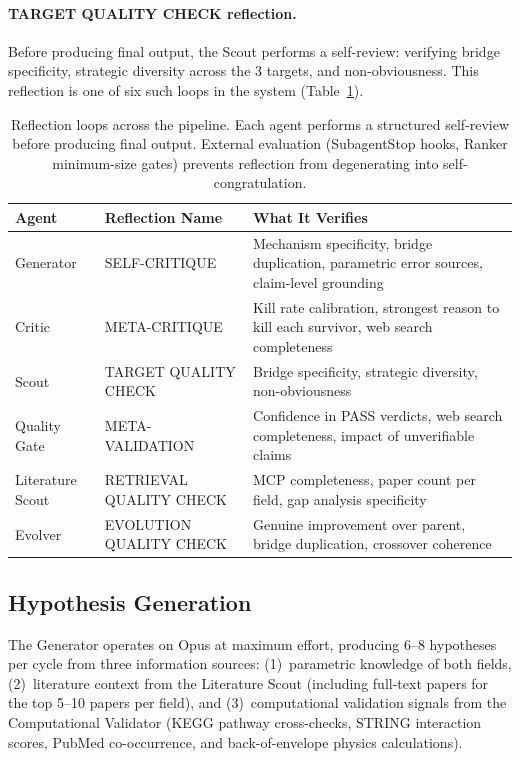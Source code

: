 \paragraph{TARGET QUALITY CHECK reflection.} Before producing final output, the Scout performs a self-review: verifying bridge specificity, strategic diversity across the 3 targets, and non-obviousness. This reflection is one of six such loops in the system (Table~\ref{tab:reflections}).

\begin{table}[t]
\centering
\caption{Reflection loops across the pipeline. Each agent performs a structured self-review before producing final output. External evaluation (SubagentStop hooks, Ranker minimum-size gates) prevents reflection from degenerating into self-congratulation.}
\label{tab:reflections}
\small
\begin{tabular}{@{}llp{6cm}@{}}
\toprule
\textbf{Agent} & \textbf{Reflection Name} & \textbf{What It Verifies} \\
\midrule
Generator & SELF-CRITIQUE & Mechanism specificity, bridge duplication, parametric error sources, claim-level grounding \\
Critic & META-CRITIQUE & Kill rate calibration, strongest reason to kill each survivor, web search completeness \\
Scout & TARGET QUALITY CHECK & Bridge specificity, strategic diversity, non-obviousness \\
Quality Gate & META-VALIDATION & Confidence in PASS verdicts, web search completeness, impact of unverifiable claims \\
Literature Scout & RETRIEVAL QUALITY CHECK & MCP completeness, paper count per field, gap analysis specificity \\
Evolver & EVOLUTION QUALITY CHECK & Genuine improvement over parent, bridge duplication, crossover coherence \\
\bottomrule
\end{tabular}
\end{table}

\subsection{Hypothesis Generation}
\label{sec:generation}

The Generator operates on Opus at maximum effort, producing 6--8 hypotheses per cycle from three information sources: (1)~parametric knowledge of both fields, (2)~literature context from the Literature Scout (including full-text papers for the top 5--10 papers per field), and (3)~computational validation signals from the Computational Validator (KEGG pathway cross-checks, STRING interaction scores, PubMed co-occurrence, and back-of-envelope physics calculations).

